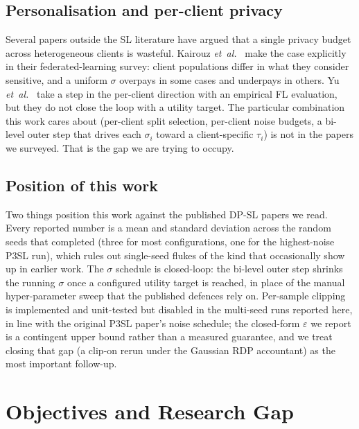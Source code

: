 \documentclass[11pt,a4paper,oneside]{report}
\begin{document}
\section{Personalisation and per-client privacy}

Several papers outside the SL literature have argued that a single
privacy budget across heterogeneous clients is wasteful. Kairouz
\textit{et~al.}~\cite{kairouz2019advances} make the case explicitly in
their federated-learning survey: client populations differ in what they
consider sensitive, and a uniform $\sigma$ overpays in some cases and
underpays in others. Yu \textit{et~al.}~\cite{yu2021personalizedfl}
take a step in the per-client direction with an empirical FL
evaluation, but they do not close the loop with a utility target. The
particular combination this work cares about (per-client split
selection, per-client noise budgets, a bi-level outer step that drives
each $\sigma_i$ toward a client-specific $\tau_i$) is not in the papers
we surveyed. That is the gap we are trying to occupy.

\section{Position of this work}

Two things position this work against the published DP-SL papers we
read. Every reported number is a mean and standard deviation across
the random seeds that completed (three for most configurations, one
for the highest-noise P3SL run), which rules out single-seed flukes
of the kind that occasionally show up in earlier work. The $\sigma$
schedule is closed-loop: the bi-level outer step shrinks the running
$\sigma$ once a configured utility target is reached, in place of the
manual hyper-parameter sweep that the published defences rely on.
Per-sample clipping is implemented and unit-tested but disabled in
the multi-seed runs reported here, in line with the original P3SL
paper's noise schedule; the closed-form $\varepsilon$ we report is a
contingent upper bound rather than a measured guarantee, and we
treat closing that gap (a clip-on rerun under the Gaussian RDP
accountant) as the most important follow-up.

\chapter{Objectives and Research Gap}
\label{ch:objectives}
\end{document}
